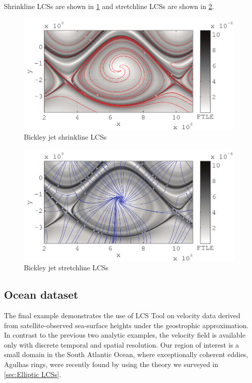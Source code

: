 \documentclass{article}
\begin{document}
Shrinkline LCSs are shown in \cref{fig:Bickley_jet_strain_lcs} and stretchline LCSs are shown in \cref{fig:Bickley_jet_stretch_lcs}.

\begin{figure}
\centering
\includegraphics[width=.85\textwidth]{graphics/bickley_jet/strain_lcs}
\caption{Bickley jet shrinkline LCSs}
\label{fig:Bickley_jet_strain_lcs}
\end{figure}

\begin{figure}
  \centering
  \includegraphics[width=.85\textwidth]{graphics/bickley_jet/stretch_lcs}
  \caption{Bickley jet stretchline LCSs}
  \label{fig:Bickley_jet_stretch_lcs}
\end{figure}

\clearpage

\subsection{Ocean dataset}
\label{sec:oceandataset}

The final example demonstrates the use of LCS Tool on velocity data derived from satellite-observed sea-surface heights under the geostrophic approximation. In contrast to the previous two analytic examples, the velocity field is available only with discrete temporal and spatial resolution. Our region of interest is a small domain in the South Atlantic Ocean, where exceptionally coherent eddies, Agulhas rings, were recently found by \textcite{haller13:_coher_lagran} using the theory we surveyed in \cref{sec:Elliptic LCSs}.
\end{document}
